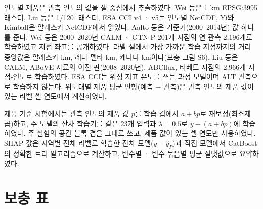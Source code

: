 \documentclass[pdflatex,sn-nature]{sn-jnl}
\begin{document}
연도별 제품은 관측 연도의 값을 셀 중심에서 추출하였다. Wei 등\cite{Wei2026}은 1 km EPSG:3995 래스터, Liu 등\cite{Liu2024}은 1/120$^\circ$ 래스터, ESA CCI v4 · v5\cite{Westermann2024,Westermann2025}는 연도별 NetCDF, Yi와 Kimball\cite{YiKimball2019}은 알래스카 NetCDF에서 읽었다. Aalto 등\cite{Aalto2018}은 기준기(2000--2014년) 값 하나를 준다. Wei 등은 2000--2020년 CALM · GTN-P 201개 지점의 연 관측 2,196개로 학습하였고 지점 좌표를 공개하였다. 라벨 셀에서 가장 가까운 학습 지점까지의 거리 중앙값은 알래스카 \ndistweiAkmed{} km, 레나 델타 \ndistweiLemed{} km, 캐나다 \ndistweiCamed{} km이다(보충 그림 S6). Liu 등은 CALM, ABoVE 자료의 이전 판(2008--2020년), ABCflux, 티베트 지점의 2,966개 지점-연도로 학습하였다. ESA CCI는 위성 지표 온도를 쓰는 과정 모델이며 ALT 관측으로 학습하지 않는다. 위도대별 제품 평균 편향(예측 − 관측)은 관측 연도의 제품 값이 있는 라벨 셀-연도에서 계산하였다.

제품 기준 시험에서는 관측 연도의 제품 값 $p$를 학습 겹에서 $a+bp$로 재보정(최소제곱)하고, 주 모델의 잔차 학습기를 같은 23개 입력과 $\lambda=0.5$로 $y-(a+bp)$에 학습하였다. 주 실험의 공간 블록 겹을 그대로 쓰고, 제품 값이 있는 셀-연도만 사용하였다. SHAP 값\cite{Lundberg2017}은 지역별 전체 라벨로 학습한 잔차 모델($y-\hat{y}_P$)과 직접 모델에서 CatBoost의 정확한 트리 알고리즘으로 계산하고, 변수별 · 변수 묶음별 평균 절댓값으로 요약하였다.

\section{보충 표}
\end{document}
